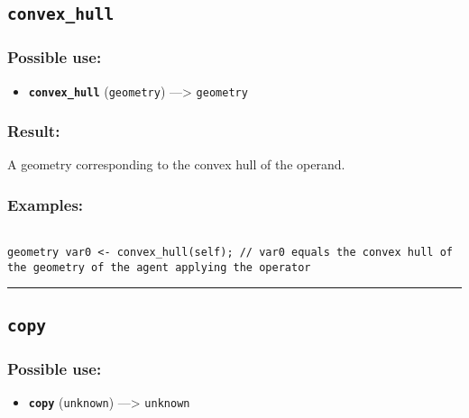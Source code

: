 \documentclass[]{book}
\providecommand{\tightlist}{%
  \setlength{\itemsep}{0pt}\setlength{\parskip}{0pt}}
\theoremstyle{definition}
\theoremstyle{definition}
\theoremstyle{definition}
\theoremstyle{remark}
\begin{document}
\subsection{\texorpdfstring{\texttt{convex\_hull}}{convex\_hull}}\label{convex_hull}

\subsubsection{Possible use:}\label{possible-use-105}

\begin{itemize}
\tightlist
\item
  \textbf{\texttt{convex\_hull}} (\texttt{geometry}) ---\textgreater{}
  \texttt{geometry}
\end{itemize}

\subsubsection{Result:}\label{result-102}

A geometry corresponding to the convex hull of the operand.

\subsubsection{Examples:}\label{examples-81}

\begin{verbatim}
 
geometry var0 <- convex_hull(self); // var0 equals the convex hull of the geometry of the agent applying the operator
\end{verbatim}

\begin{center}\rule{0.5\linewidth}{\linethickness}\end{center}

\subsection{\texorpdfstring{\texttt{copy}}{copy}}\label{copy}

\subsubsection{Possible use:}\label{possible-use-106}

\begin{itemize}
\tightlist
\item
  \textbf{\texttt{copy}} (\texttt{unknown}) ---\textgreater{}
  \texttt{unknown}
\end{itemize}
\end{document}
